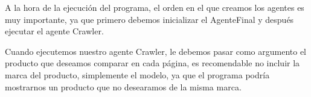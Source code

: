 \documentclass{pre-tfg}
\begin{document}
A la hora de la ejecución del programa, el orden en el que creamos los agentes es muy importante, ya que primero debemos inicializar el AgenteFinal y después ejecutar el agente Crawler.

Cuando ejecutemos nuestro agente Crawler, le debemos pasar como argumento el producto que deseamos comparar en cada página, es recomendable no incluir la marca del producto, simplemente el modelo, ya que el programa podría mostrarnos un producto que no desearamos de la misma marca.
\end{document}
